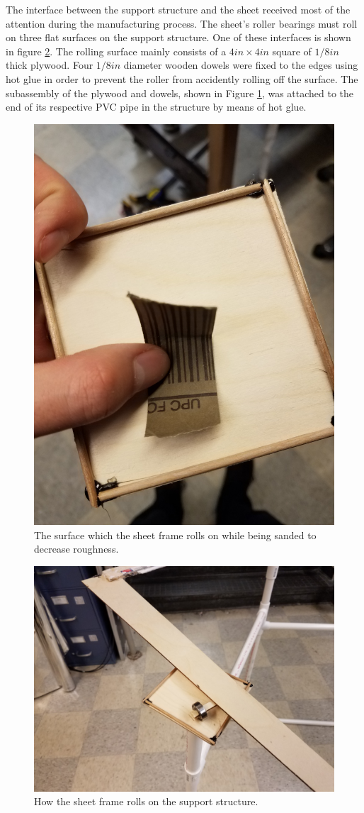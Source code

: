 \documentclass[12pt]{report} %
\begin{document}
The interface between the support structure and the sheet received most of the attention during the manufacturing process.
The sheet's roller bearings must roll on three flat surfaces on the support structure. One of these interfaces is shown in
figure \ref{roller}. The rolling surface mainly consists of a $4 in \times 4 in$ square of $1/8 in$ thick plywood. Four $1/8
in$ diameter wooden dowels were fixed to the edges using hot glue in order to prevent the roller from accidently rolling off
the surface. The subassembly of the plywood and dowels, shown in Figure \ref{surface}, was attached to the end of its
respective PVC pipe in the structure by means of hot glue.

\begin{figure}
\includegraphics[width = 0.7\linewidth]{sanding.jpg}
\centering
\caption{The surface which the sheet frame rolls on while being sanded to decrease roughness.}
\label{surface}
\end{figure}

\begin{figure}
\includegraphics[width = 0.7\linewidth]{roller.jpg}
\centering
\caption{How the sheet frame rolls on the support structure.}
\label{roller}
\end{figure}
\end{document}
